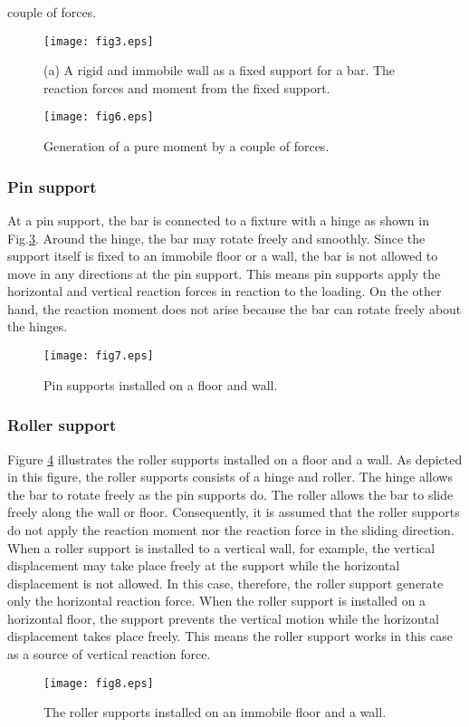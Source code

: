 ﻿\documentclass[10pt,a4j]{article}
\begin{document}
couple of forces.
\begin{figure}[h]
	\begin{center}
	\texttt{[image: fig3.eps]} 
	\end{center}
	\caption{(a) A rigid and immobile wall as a fixed support for a bar. 
	The reaction forces and moment  from the fixed support.} 
	\label{fig:fig3}
\end{figure}
\begin{figure}[h]
	\begin{center}
	\texttt{[image: fig6.eps]} 
	\end{center}
	\caption{Generation of a pure moment by a couple of forces.} 
	\label{fig:fig6}
\end{figure}
\subsubsection{Pin support}
At a pin support, the bar is connected to a fixture with a hinge 
as shown in Fig.\ref{fig:fig7}. Around the hinge, the bar may rotate 
freely and smoothly. Since the support itself is fixed to an immobile 
floor or a wall, the bar is not allowed to move in any directions at the 
pin support.  This means pin supports apply the horizontal and vertical 
reaction forces in reaction to the loading. On the other hand, the reaction 
moment does not arise because the bar can rotate freely about the hinges. 
\begin{figure}[h]
	\begin{center}
	\texttt{[image: fig7.eps]} 
	\end{center}
	\caption{Pin supports installed on a floor and wall.} 
	\label{fig:fig7}
\end{figure}
\subsubsection{Roller support}
Figure \ref{fig:fig8} illustrates the roller supports installed on a floor and a wall. 
As depicted in this figure, the roller supports consists of a hinge and roller. 
The hinge allows the bar to rotate freely as the pin supports do. 
The roller allows the bar to slide freely along the wall or floor.  
Consequently, it is assumed that the roller supports do not apply 
the reaction moment nor the reaction force in the sliding direction. 
When a roller support is installed to a vertical wall, for example, the vertical 
 displacement may take place freely at the support while the horizontal displacement 
is not allowed. In this case, therefore, the roller support generate only the horizontal 
reaction force. When the roller support is installed on a horizontal floor, 
the support prevents the vertical motion while the horizontal 
displacement takes place freely. This means the roller support works in this case 
as a source of vertical reaction force.
\begin{figure}[h]
	\begin{center}
	\texttt{[image: fig8.eps]} 
	\end{center}
	\caption{The roller supports installed on an immobile floor and a wall.} 
	\label{fig:fig8}
\end{figure}
\end{document}
